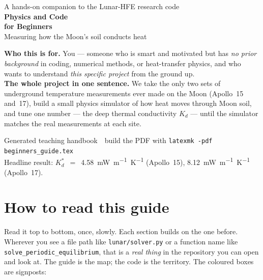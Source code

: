 \documentclass[11pt,oneside]{article}
\newcommand{\Kd}{\ensuremath{K_d}}
\newcommand{\Kdstar}{\ensuremath{K_d^{*}}}
\newcommand{\code}[1]{\texttt{\small #1}}
\newcommand{\file}[1]{\texttt{\small #1}}
\newcommand{\mwmk}{\unit{mW.m^{-1}.K^{-1}}}
\begin{document}
\begin{titlepage}
\centering
\vspace*{2.2cm}
{\color{dim}\large A hands-on companion to the Lunar-HFE research code}\\[1.6cm]
{\color{char}\Huge\bfseries Physics and Code\\[0.35cm] for Beginners}\\[0.8cm]
{\color{coral}\LARGE Measuring how the Moon's soil conducts heat}\\[2.0cm]

\begin{tcolorbox}[enhanced, width=0.82\textwidth, colback=paper,
  colframe=teal, boxrule=0.8pt, arc=3pt, halign=flush left]
\textbf{Who this is for.} You --- someone who is smart and motivated but has
\emph{no prior background} in coding, numerical methods, or heat-transfer
physics, and who wants to understand \emph{this specific project} from the
ground up.\\[4pt]
\textbf{The whole project in one sentence.} We take the only two sets of
underground temperature measurements ever made on the Moon (Apollo~15 and~17),
build a small physics simulator of how heat moves through Moon soil, and tune
one number --- the deep thermal conductivity \Kd{} --- until the simulator
matches the real measurements at each site.
\end{tcolorbox}

\vfill
{\color{dim}\small Generated teaching handbook \,\textbullet\, build the PDF with
\texttt{latexmk -pdf beginners\_guide.tex}}\\[2pt]
{\color{dim}\small Headline result: \Kdstar{}~$=$~\num{4.58}~\mwmk{} (Apollo~15),
\num{8.12}~\mwmk{} (Apollo~17).}
\vspace*{1.2cm}
\end{titlepage}

\tableofcontents
\listoffigures
\clearpage

\section*{How to read this guide}
Read it top to bottom, once, slowly. Each section builds on the one before.
Wherever you see a file path like \file{lunar/solver.py} or a function name
like \code{solve\_periodic\_equilibrium}, that is a \emph{real thing} in the
repository you can open and look at. The guide is the map; the code is the
territory. The coloured boxes are signposts:
\end{document}
